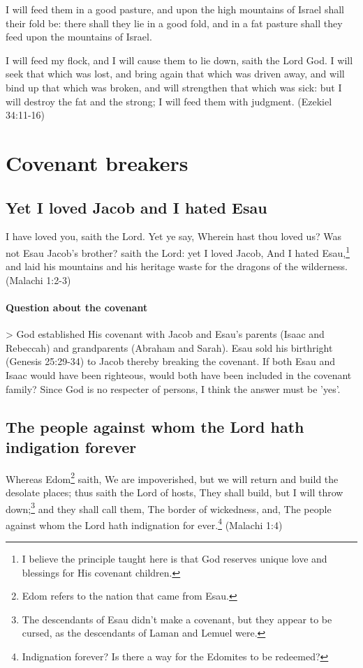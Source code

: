 I will feed them in a good pasture, and upon the high mountains of Israel shall their fold be: there shall they lie in a good fold, and in a fat pasture shall they feed upon the mountains of Israel.

I will feed my flock, and I will cause them to lie down, saith the Lord God. I will seek that which was lost, and bring again that which was driven away, and will bind up that which was broken, and will strengthen that which was sick: but I will destroy the fat and the strong; I will feed them with judgment. (Ezekiel 34:11-16)

\section{Covenant breakers}

\subsection{Yet I loved Jacob and I hated Esau}
I have loved you, saith the Lord. Yet ye say, Wherein hast thou loved us? Was not Esau Jacob's brother? saith the Lord: yet I loved Jacob, And I hated Esau,\footnote{I believe the principle taught here is that God reserves unique love and blessings for His covenant children.} and laid his mountains and his heritage waste for the dragons of the wilderness. (Malachi 1:2-3)

\paragraph{Question about the covenant}
> God established His covenant with Jacob and Esau's parents (Isaac and Rebeccah) and grandparents (Abraham and Sarah). Esau sold his birthright (Genesis 25:29-34) to Jacob thereby breaking the covenant. If both Esau and Isaac would have been righteous, would both have been included in the covenant family? Since God is no respecter of persons, I think the answer must be 'yes'.

\subsection{The people against whom the Lord hath indigation forever}
Whereas Edom\footnote{Edom refers to the nation that came from Esau.} saith, We are impoverished, but we will return and build the desolate places; thus saith the Lord of hosts, They shall build, but I will throw down;\footnote{The descendants of Esau didn't make a covenant, but they appear to be cursed, as the descendants of Laman and Lemuel were.} and they shall call them, The border of wickedness, and, The people against whom the Lord hath indignation for ever.\footnote{Indignation forever? Is there a way for the Edomites to be redeemed?} (Malachi 1:4)

